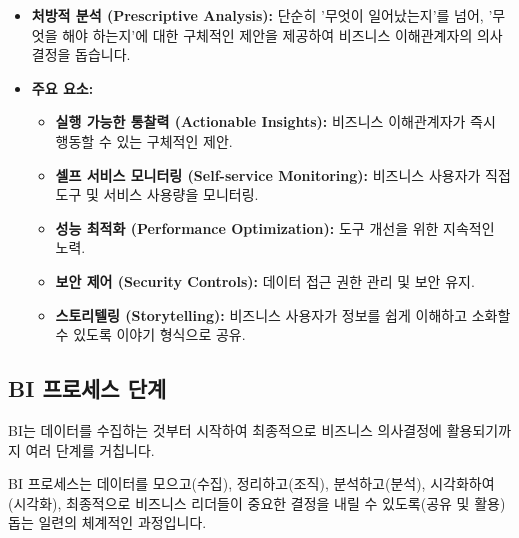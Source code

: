 \documentclass[11pt,a4paper]{article}
\begin{document}
\begin{itemize}
    \item \textbf{처방적 분석 (Prescriptive Analysis):} 단순히 '무엇이 일어났는지'를 넘어, '무엇을 해야 하는지'에 대한 구체적인 제안을 제공하여 비즈니스 이해관계자의 의사결정을 돕습니다.
    \item \textbf{주요 요소:}
    \begin{itemize}
        \item \textbf{실행 가능한 통찰력 (Actionable Insights):} 비즈니스 이해관계자가 즉시 행동할 수 있는 구체적인 제안.
        \item \textbf{셀프 서비스 모니터링 (Self-service Monitoring):} 비즈니스 사용자가 직접 도구 및 서비스 사용량을 모니터링.
        \item \textbf{성능 최적화 (Performance Optimization):} 도구 개선을 위한 지속적인 노력.
        \item \textbf{보안 제어 (Security Controls):} 데이터 접근 권한 관리 및 보안 유지.
        \item \textbf{스토리텔링 (Storytelling):} 비즈니스 사용자가 정보를 쉽게 이해하고 소화할 수 있도록 이야기 형식으로 공유.
    \end{itemize}
\end{itemize}

\subsection{BI 프로세스 단계}
BI는 데이터를 수집하는 것부터 시작하여 최종적으로 비즈니스 의사결정에 활용되기까지 여러 단계를 거칩니다.

\begin{tcolorbox}[mybox={핵심 요약: 데이터에서 의사결정까지}]
BI 프로세스는 데이터를 모으고(수집), 정리하고(조직), 분석하고(분석), 시각화하여(시각화), 최종적으로 비즈니스 리더들이 중요한 결정을 내릴 수 있도록(공유 및 활용) 돕는 일련의 체계적인 과정입니다.
\end{tcolorbox}
\end{document}
